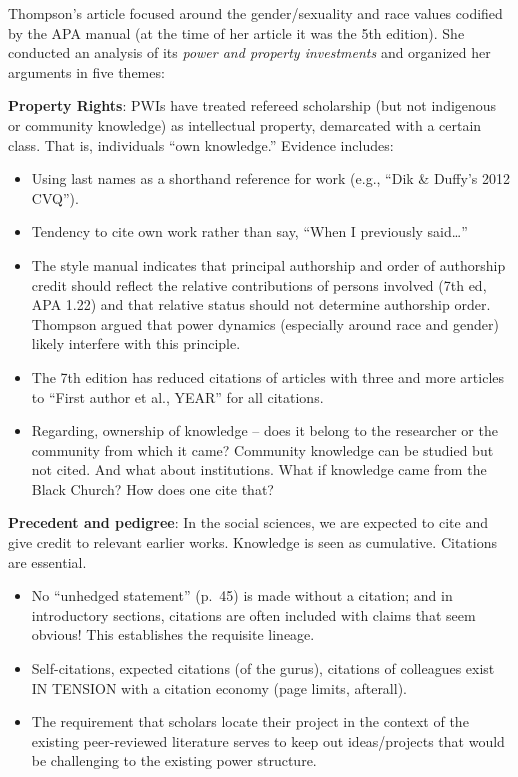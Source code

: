 \documentclass[
  english,
]{book}
\providecommand{\tightlist}{%
  \setlength{\itemsep}{0pt}\setlength{\parskip}{0pt}}
\begin{document}
Thompson's \citeyearpar{thompson_gentlemanly_2004} article focused around the gender/sexuality and race values codified by the APA manual (at the time of her article it was the 5th edition). She conducted an analysis of its \emph{power and property investments} and organized her arguments in five themes:

\textbf{Property Rights}: PWIs have treated refereed scholarship (but not indigenous or community knowledge) as intellectual property, demarcated with a certain class. That is, individuals ``own knowledge.'' Evidence includes:

\begin{itemize}
\tightlist
\item
  Using last names as a shorthand reference for work (e.g., ``Dik \& Duffy's 2012 CVQ'').
\item
  Tendency to cite own work rather than say, ``When I previously said\ldots{}''
\item
  The style manual indicates that principal authorship and order of authorship credit should reflect the relative contributions of persons involved (7th ed, APA 1.22) and that relative status should not determine authorship order. Thompson argued that power dynamics (especially around race and gender) likely interfere with this principle.
\item
  The 7th edition has reduced citations of articles with three and more articles to ``First author et al., YEAR'' for all citations.\\
\item
  Regarding, ownership of knowledge -- does it belong to the researcher or the community from which it came? Community knowledge can be studied but not cited. And what about institutions. What if knowledge came from the Black Church? How does one cite that?
\end{itemize}

\textbf{Precedent and pedigree}: In the social sciences, we are expected to cite and give credit to relevant earlier works. Knowledge is seen as cumulative. Citations are essential.

\begin{itemize}
\tightlist
\item
  No ``unhedged statement'' (p.~45) is made without a citation; and in introductory sections, citations are often included with claims that seem obvious! This establishes the requisite lineage.
\item
  Self-citations, expected citations (of the gurus), citations of colleagues exist IN TENSION with a citation economy (page limits, afterall).
\item
  The requirement that scholars locate their project in the context of the existing peer-reviewed literature serves to keep out ideas/projects that would be challenging to the existing power structure.
\end{itemize}
\end{document}
